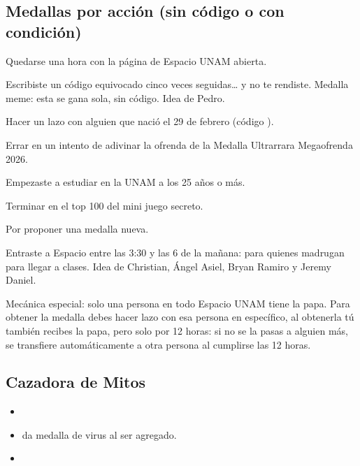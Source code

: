 \subsection*{Medallas por acción (sin código o con condición)}
\begin{description}[leftmargin=3.6cm, style=nextline]
  \item[No deberías estar estudiando] Quedarse una hora con la página de Espacio UNAM abierta.
  \item[Quizás funcione] Escribiste un código equivocado cinco veces seguidas… y no te rendiste. Medalla meme: esta se gana sola, sin código. Idea de Pedro.
  \item[Bisiesto] Hacer un lazo con alguien que nació el 29 de febrero (código ).
  \item[Quedé] Errar en un intento de adivinar la ofrenda de la Medalla Ultrarrara Megaofrenda 2026.
  \item[Soñador] Empezaste a estudiar en la UNAM a los 25 años o más.
  \item[Top 100] Terminar en el top 100 del mini juego secreto.
  \item[Proponer una medalla] Por proponer una medalla nueva.
  \item[Gallo madrugador] Entraste a Espacio entre las 3:30 y las 6 de la mañana: para quienes madrugan para llegar a clases. Idea de Christian, Ángel Asiel, Bryan Ramiro y Jeremy Daniel.
  \item[Papa caliente] Mecánica especial: solo una persona en todo Espacio UNAM tiene la papa. Para obtener la medalla debes hacer lazo con esa persona en específico, al obtenerla tú también recibes la papa, pero solo por 12 horas: si no se la pasas a alguien más, se transfiere automáticamente a otra persona al cumplirse las 12 horas.
\end{description}

\subsection*{Cazadora de Mitos}
\begin{itemize}[leftmargin=*]
  \item {}
  \item {} da medalla de virus al ser agregado.
  \item {}
\end{itemize}

